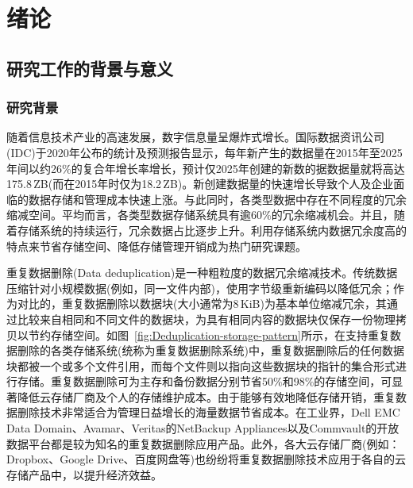 \chapter{绪\hspace{6pt}论}
\label{chapter:introduction}

\section{研究工作的背景与意义}
\label{sec:intro}
\subsection{研究背景}
\label{subsec:intro-background}

随着信息技术产业的高速发展，数字信息量呈爆炸式增长。国际数据资讯公司(IDC)\cite{IDC}于2020年公布的统计及预测报告\cite{DataReport2020}显示，每年新产生的数据量在2015年至2025年间以约26\%的复合年增长率增长，预计仅2025年创建的新数的据数据量就将高达175.8\,ZB(而在2015年时仅为18.2\,ZB)。新创建数据量的快速增长导致个人及企业面临的数据存储和管理成本快速上涨\cite{敖莉2010重复数据删除技术}。与此同时，各类型数据中存在不同程度的冗余缩减空间。平均而言，各类型数据存储系统具有逾60\%的冗余缩减机会。并且，随着存储系统的持续运行，冗余数据占比逐步上升\cite{mcknight2006digital}。利用存储系统内数据冗余度高的特点来节省存储空间、降低存储管理开销成为热门研究课题。

重复数据删除(Data deduplication)\cite{付印金2012重复数据删除关键技术研究进展, 敖莉2010重复数据删除技术,xia2016Deduplication,Paulo2014}是一种粗粒度的数据冗余缩减技术。传统数据压缩针对小规模数据(例如，同一文件内部)，使用字节级重新编码以降低冗余；作为对比的，重复数据删除以数据块(大小通常为8\,KiB)为基本单位缩减冗余，其通过比较来自相同和不同文件的数据块，为具有相同内容的数据块仅保存一份物理拷贝以节约存储空间。如图~\ref{fig:Deduplication-storage-pattern}所示，在支持重复数据删除的各类存储系统(统称为重复数据删除系统)中，重复数据删除后的任何数据块都被一个或多个文件引用，而每个文件则以指向这些数据块的指针的集合形式进行存储。重复数据删除可为主存和备份数据分别节省50\%\cite{meyer2011deduplication}和98\%\cite{wallace12}的存储空间，可显著降低云存储厂商及个人的存储维护成本\cite{付印金2012重复数据删除关键技术研究进展}。由于能够有效地降低存储开销，重复数据删除技术非常适合为管理日益增长的海量数据节省成本。在工业界，Dell EMC Data Domain\cite{EMCDataDomain}、Avamar\cite{Avamar}、Veritas的NetBackup Appliances\cite{veritas}以及Commvault的开放数据平台\cite{CommVault}都是较为知名的重复数据删除应用产品。此外，各大云存储厂商(例如：Dropbox\cite{Dropbox}、Google Drive\cite{GoogleDrive}、百度网盘\cite{BaiduPan}等)也纷纷将重复数据删除技术应用于各自的云存储产品中，以提升经济效益\cite{harnik2010side}。

